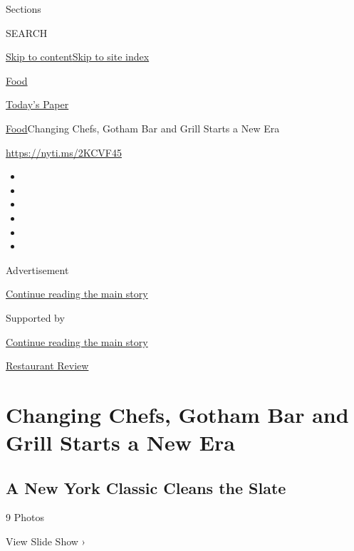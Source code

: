 Sections

SEARCH

\protect\hyperlink{site-content}{Skip to
content}\protect\hyperlink{site-index}{Skip to site index}

\href{https://www.nytimes3xbfgragh.onion/section/food}{Food}

\href{https://myaccount.nytimes3xbfgragh.onion/auth/login?response_type=cookie\&client_id=vi}{}

\href{https://www.nytimes3xbfgragh.onion/section/todayspaper}{Today's
Paper}

\href{/section/food}{Food}\textbar{}Changing Chefs, Gotham Bar and Grill
Starts a New Era

\url{https://nyti.ms/2KCVF45}

\begin{itemize}
\item
\item
\item
\item
\item
\item
\end{itemize}

Advertisement

\protect\hyperlink{after-top}{Continue reading the main story}

Supported by

\protect\hyperlink{after-sponsor}{Continue reading the main story}

\href{/column/restaurant-review}{Restaurant Review}

\hypertarget{changing-chefs-gotham-bar-and-grill-starts-a-new-era}{%
\section{Changing Chefs, Gotham Bar and Grill Starts a New
Era}\label{changing-chefs-gotham-bar-and-grill-starts-a-new-era}}

\href{https://www.nytimes3xbfgragh.onion/slideshow/2019/11/19/dining/gotham-bar-and-grill-nyc.html}{}

\hypertarget{a-new-york-classic-cleans-the-slate}{%
\subsection{A New York Classic Cleans the
Slate}\label{a-new-york-classic-cleans-the-slate}}

9 Photos

View Slide Show ›

